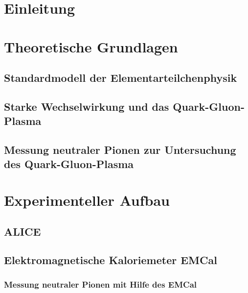 \documentclass[11pt]{article}
\author{Marvin Hemmer}
\begin{document}
\begin{titlepage}
\begin{center}

\end{center}
\end{titlepage}
\newpage
\tableofcontents
\newpage

\section*{Einleitung}

\section{Theoretische Grundlagen} \label{s1}

\subsection{Standardmodell der Elementarteilchenphysik} \label{s1s1}

\subsection{Starke Wechselwirkung und das Quark-Gluon-Plasma} \label{s1s2}

\subsection{Messung neutraler Pionen zur Untersuchung des Quark-Gluon-Plasma} \label{s1s3}

\newpage

\section{Experimenteller Aufbau} \label{s2}

\subsection{ALICE} \label{s2s1}

\subsection{Elektromagnetische Kaloriemeter EMCal} \label{s2s2}

\subsubsection{Messung neutraler Pionen mit Hilfe des EMCal} \label{s2s2s1}

\end{document}
